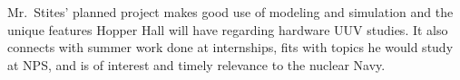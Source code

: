 \documentclass[10pt,courier]{navymemo}
\begin{document}
\section{}
Mr.~Stites' planned project makes good use of modeling and simulation and the unique features Hopper Hall will have regarding hardware UUV studies. It also connects with summer work done at internships, fits with topics he would study at NPS, and is of interest and timely relevance to the nuclear Navy. 

\noclosing{}
\signature{}
\signature{D EVANGELISTA}
\end{document}
